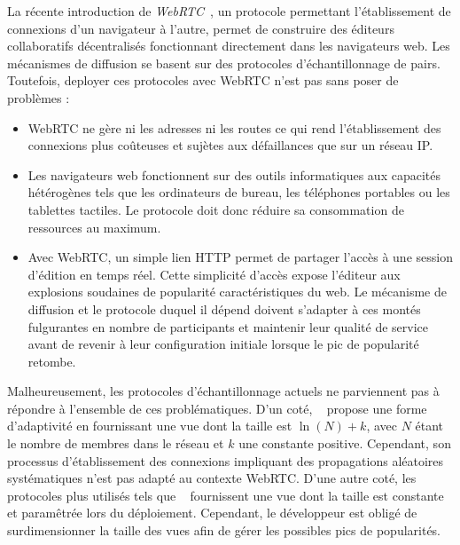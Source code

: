 La récente introduction de \emph{WebRTC}~\cite{webrtc}, un protocole permettant
l'établissement de connexions d'un navigateur à l'autre, permet de construire
des éditeurs collaboratifs décentralisés fonctionnant directement dans les
navigateurs web.  Les mécanismes de diffusion se basent sur des protocoles
d'échantillonnage de pairs. Toutefois, deployer ces protocoles avec WebRTC n'est
pas sans poser de problèmes :
\begin{itemize}
\item WebRTC ne gère ni les adresses ni les routes ce qui rend l'établissement
  des connexions plus coûteuses et sujètes aux défaillances que sur un réseau
  IP.
\item Les navigateurs web fonctionnent sur des outils informatiques aux
  capacités hétérogènes tels que les ordinateurs de bureau, les téléphones
  portables ou les tablettes tactiles. Le protocole doit donc réduire sa
  consommation de ressources au maximum.
\item Avec WebRTC, un simple lien HTTP %
  permet de partager l'accès à une session d'édition en temps réel. Cette
  simplicité d'accès expose l'éditeur aux explosions soudaines de popularité
  caractéristiques du web.
  Le mécanisme de diffusion et le protocole duquel il dépend doivent s'adapter à
  ces montés fulgurantes en nombre de participants et maintenir leur qualité de
  service avant de revenir à leur configuration initiale lorsque le pic de
  popularité retombe.
\end{itemize}

Malheureusement, les protocoles d'échantillonnage actuels ne parviennent pas à
répondre à l'ensemble de ces problématiques. D'un coté,
\SCAMP~\cite{ganesh2001scamp, ganesh2003peer} propose une forme d'adaptivité en
fournissant une vue dont la taille est $\ln (N) + k$, avec $N$ étant le nombre
de membres dans le réseau et $k$ une constante positive. Cependant, son
processus d'établissement des connexions impliquant des propagations aléatoires
systématiques n'est pas adapté au contexte WebRTC. D'une autre coté, les
protocoles plus utilisés tels que \CYCLON~\cite{voulgaris2005cyclon} fournissent
une vue dont la taille est constante et paramêtrée lors du
déploiement. Cependant, le développeur est obligé de surdimensionner la taille
des vues afin de gérer les possibles pics de popularités. 


